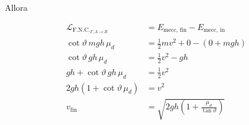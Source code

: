 Allora

\begin{align*}
	\mathcal{L}_{\text{F.N.C.}_{\Gamma, A \to B}} &= E_{\text{mecc, fin}} - E_{\text{mecc, in}} \\
	\cot\vartheta \,mgh\, \mu_d &= \frac{1}{2}mv^2 +0 - (0 + mgh) \\
	\cot\vartheta \,gh\, \mu_d &= \frac{1}{2}v^2 -gh \\
	gh + \cot\vartheta \,gh\, \mu_d &= \frac{1}{2}v^2 \\
	2gh (1 + \cot\vartheta \, \mu_d) &= v^2 \\
	v_{\text{fin}} &= \sqrt{2gh\left(1+\frac{\mu_d}{\tan\vartheta}\right)}
\end{align*}
